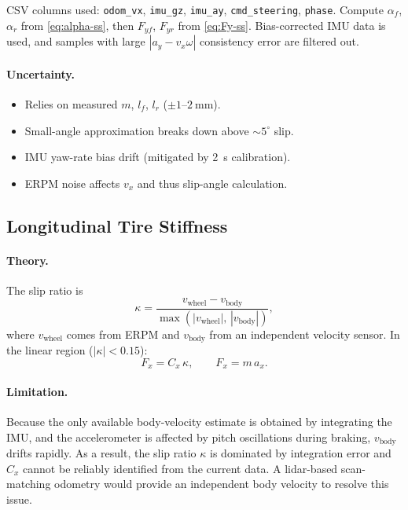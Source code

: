 \documentclass[11pt,a4paper]{article}
\begin{document}
\noindent CSV columns used: \texttt{odom\_vx}, \texttt{imu\_gz},
\texttt{imu\_ay}, \texttt{cmd\_steering}, \texttt{phase}.
Compute $\alpha_f$, $\alpha_r$ from \eqref{eq:alpha-ss}, then
$F_{yf}$, $F_{yr}$ from \eqref{eq:Fy-ss}.
Bias-corrected IMU data is used, and samples with large
$|a_y-v_x\omega|$ consistency error are filtered out.

\paragraph{Uncertainty.}
\begin{itemize}
  \item Relies on measured $m$, $l_f$, $l_r$ ($\pm 1$--$\SI{2}{\milli\metre}$).
  \item Small-angle approximation breaks down above $\sim 5^\circ$ slip.
  \item IMU yaw-rate bias drift (mitigated by \SI{2}{\second} calibration).
  \item ERPM noise affects $v_x$ and thus slip-angle calculation.
\end{itemize}

\subsection{Longitudinal Tire Stiffness}\label{sec:long-stiffness}

\paragraph{Theory.}
The slip ratio is
\begin{equation}\label{eq:kappa}
  \kappa = \frac{v_\text{wheel} - v_\text{body}}
               {\max(|v_\text{wheel}|,\,|v_\text{body}|)},
\end{equation}
where $v_\text{wheel}$ comes from ERPM and $v_\text{body}$ from an
independent velocity sensor. In the linear region ($|\kappa|<0.15$):
\begin{equation}\label{eq:Fx}
  F_x = C_x\,\kappa, \qquad F_x = m\,a_x.
\end{equation}

\paragraph{Limitation.}
Because the only available body-velocity estimate is obtained by
integrating the IMU, and the accelerometer is affected by pitch
oscillations during braking, $v_\text{body}$ drifts rapidly.
As a result, the slip ratio $\kappa$ is dominated by integration error and
$C_x$ cannot be reliably identified from the current data.
A lidar-based scan-matching odometry would provide an independent
body velocity to resolve this issue.
\end{document}
